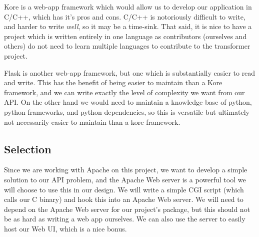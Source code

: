 Kore is a web-app framework which would allow us to develop our application in C/C++, which has it's pros and cons.
C/C++ is notoriously difficult to write, and harder to write \textit{well}, so it may be a time-sink.
That said, it is nice to have a project which is written entirely in one language as contributors (ourselves and others) do not need to learn multiple languages to contribute to the transformer project.

Flask is another web-app framework, but one which is substantially easier to read and write.
This has the benefit of being easier to maintain than a Kore framework, and we can write exactly the level of complexity we want from our API.
On the other hand we would need to maintain a knowledge base of python, python frameworks, and python dependencies, so this is versatile but ultimately not necessarily easier to maintain than a kore framework.

\subsection{Selection}

Since we are working with Apache on this project, we want to develop a simple solution to our API problem, and the Apache Web server is a powerful tool we will choose to use this in our design.
We will write a simple CGI script (which calls our C binary) and hook this into an Apache Web server.
We will need to depend on the Apache Web server for our project's package, but this should not be as hard as writing a web app ourselves.
We can also use the server to easily host our Web UI, which is a nice bonus.
